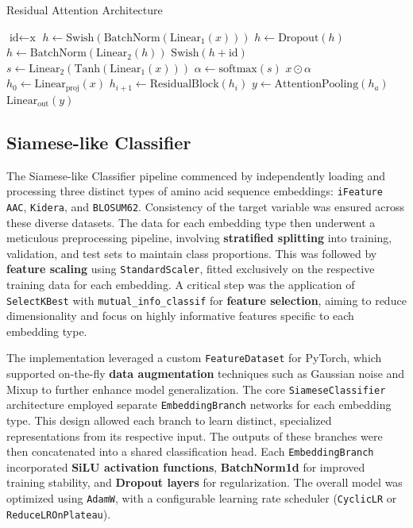 \documentclass{article}
\begin{document}
\begin{algorithm}
\caption{Residual Attention Architecture}
\begin{algorithmic}[1]
\Statex
{}
    \State $\text{id} \gets \text{x}$
    \State $h \gets \text{Swish}(\text{BatchNorm}(\text{Linear}_1(x)))$
    \State $h \gets \text{Dropout}(h)$
    \State $h \gets \text{BatchNorm}(\text{Linear}_2(h))$
    \State \Return $\text{Swish}(h + \text{id})$
\EndFunction
\Statex
{}
    \State $s \gets \text{Linear}_2(\text{Tanh}(\text{Linear}_1(x)))$ 
    \State $\alpha \gets \text{softmax}(s)$ 
    \State \Return $x \odot \alpha$ 
\EndFunction
\Statex
{}
    \State $h_0 \gets \text{Linear}_{\text{proj}}(x)$ 
    \State $h_{i+1} \gets \text{ResidualBlock}(h_i)$
    \State $y \gets \text{AttentionPooling}(h_a)$
    \State \Return $\text{Linear}_{\text{out}}(y)$ 
\EndFunction
\end{algorithmic}
\end{algorithm}

\subsection{Siamese-like Classifier}
The Siamese-like Classifier pipeline commenced by independently loading and processing three distinct types of amino acid sequence embeddings: \texttt{iFeature AAC}, \texttt{Kidera}, and \texttt{BLOSUM62}. Consistency of the target variable was ensured across these diverse datasets. The data for each embedding type then underwent a meticulous preprocessing pipeline, involving \textbf{stratified splitting} into training, validation, and test sets to maintain class proportions. This was followed by \textbf{feature scaling} using \texttt{StandardScaler}, fitted exclusively on the respective training data for each embedding. A critical step was the application of \texttt{SelectKBest} with \texttt{mutual\_info\_classif} for \textbf{feature selection}, aiming to reduce dimensionality and focus on highly informative features specific to each embedding type.

The implementation leveraged a custom \texttt{FeatureDataset} for PyTorch, which supported on-the-fly \textbf{data augmentation} techniques such as Gaussian noise and Mixup to further enhance model generalization. The core \texttt{SiameseClassifier} architecture employed separate \texttt{EmbeddingBranch} networks for each embedding type. This design allowed each branch to learn distinct, specialized representations from its respective input. The outputs of these branches were then concatenated into a shared classification head. Each \texttt{EmbeddingBranch} incorporated \textbf{SiLU activation functions}, \textbf{BatchNorm1d} for improved training stability, and \textbf{Dropout layers} for regularization. The overall model was optimized using \texttt{AdamW}, with a configurable learning rate scheduler (\texttt{CyclicLR} or \texttt{ReduceLROnPlateau}).
\end{document}
